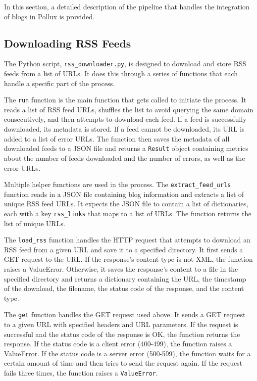\documentclass{article}
\begin{document}
In this section, a detailed description of the pipeline that handles the integration of blogs in Pollux is provided.

\subsection{Downloading RSS Feeds}

The Python script, \texttt{rss\_downloader.py}, is designed to download and store RSS feeds from a list of URLs. It does this through a series of functions that each handle a specific part of the process.

The \texttt{run} function is the main function that gets called to initiate the process. It reads a list of RSS feed URLs, shuffles the list to avoid querying the same domain consecutively, and then attempts to download each feed. If a feed is successfully downloaded, its metadata is stored. If a feed cannot be downloaded, its URL is added to a list of error URLs. The function then saves the metadata of all downloaded feeds to a JSON file and returns a \texttt{Result} object containing metrics about the number of feeds downloaded and the number of errors, as well as the error URLs.

Multiple helper functions are used in the process. The \texttt{extract\_feed\_urls} function reads in a JSON file containing blog information and extracts a list of unique RSS feed URLs. It expects the JSON file to contain a list of dictionaries, each with a key \texttt{rss\_links} that maps to a list of URLs. The function returns the list of unique URLs.

The \texttt{load\_rss} function handles the HTTP request that attempts to download an RSS feed from a given URL and save it to a specified directory. It first sends a GET request to the URL. If the response's content type is not XML, the function raises a ValueError. Otherwise, it saves the response's content to a file in the specified directory and returns a dictionary containing the URL, the timestamp of the download, the filename, the status code of the response, and the content type.

The \texttt{get} function handles the GET request used above. It sends a GET request to a given URL with specified headers and URL parameters. If the request is successful and the status code of the response is OK, the function returns the response. If the status code is a client error (400-499), the function raises a ValueError. If the status code is a server error (500-599), the function waits for a certain amount of time and then tries to send the request again. If the request fails three times, the function raises a \texttt{ValueError}.
\end{document}
